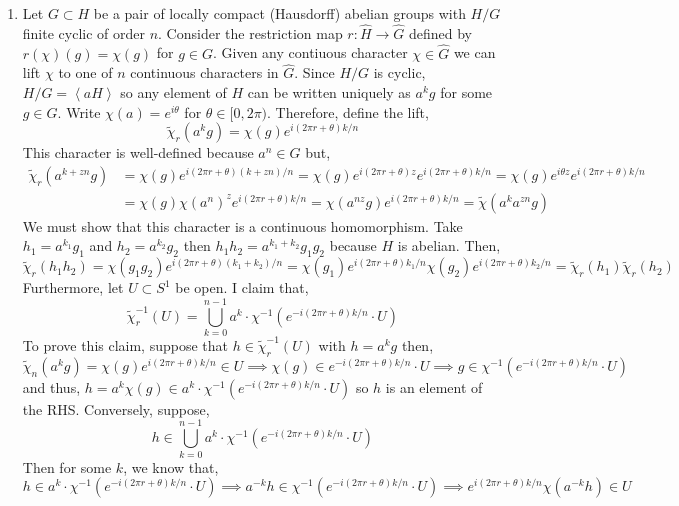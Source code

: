 \documentclass[12pt]{extarticle}
\begin{document}
 
\begin{enumerate}
\item Let $G \subset H$ be a pair of locally compact (Hausdorff) abelian groups with $H/G$ finite cyclic of order $n$. Consider the restriction map $r : \hat{H} \to \hat{G}$ defined by $r(\chi)(g) = \chi(g)$ for $g \in G$. Given any contiuous character $\chi \in \hat{G}$ we can lift $\chi$ to one of $n$ continuous characters in $\hat{G}$. Since $H/G$ is cyclic, $H/G = \left< a H \right>$ so any element of $H$ can be written uniquely as $a^k g$ for some $g \in G$. Write $\chi(a) = e^{i \theta}$ for $\theta \in [0, 2\pi)$. Therefore, define the lift,
\[\tilde{\chi}_r (a^k g) = \chi(g) e^{ i (2 \pi r + \theta) k /n } \]
This character is well-defined because $a^n \in G$ but,
\begin{align*}
\tilde{\chi}_r (a^{k + zn} g) & = \chi(g) e^{ i (2 \pi r + \theta) (k + zn) / n } = \chi(g) e^{i (2 \pi r + \theta) z} e^{ i (2 \pi r + \theta) k /  n } = \chi(g) e^{i \theta z} e^{ i (2 \pi r + \theta) k /n }
\\
& = \chi(g) \chi(a^n)^z e^{ i (2 \pi r + \theta) k /n } = \chi(a^{nz} g) e^{ i (2 \pi r + \theta) k /n } = \tilde{\chi}(a^k a^{zn} g)
\end{align*}
We must show that this character is a continuous homomorphism. Take $h_1 = a^{k_1} g_1$ and $h_2 = a^{k_2} g_2$ then $h_1 h_2 = a^{k_1 + k_2} g_1 g_2$ because $H$ is abelian. Then,
\[\tilde{\chi}_r(h_1 h_2) = \chi(g_1 g_2) e^{i (2 \pi r + \theta) (k_1 + k_2) /n} = \chi(g_1) e^{i (2 \pi r + \theta) k_1 /n} \chi(g_2) e^{i (2 \pi r + \theta) k_2 /n} = \tilde{\chi}_r(h_1) \tilde{\chi}_r(h_2)  \]
Furthermore, let $U \subset S^1$ be open. I claim that,
\[ \tilde{\chi}_r^{-1}(U) = \bigcup_{k = 0}^{n - 1} a^k \cdot \chi^{-1}(e^{- i (2 \pi r + \theta) k /n} \cdot U )  \] 
To prove this claim, suppose that $h \in \tilde{\chi}_r^{-1}(U)$ with $h = a^k g$ then,
\[\tilde{\chi}_n(a^k g) = \chi(g) e^{i (2 \pi r + \theta) k /n} \in U \implies \chi(g) \in e^{- i (2 \pi r + \theta) k /n} \cdot U  \implies g \in \chi^{-1}(e^{- i (2 \pi r + \theta) k /n} \cdot U) \]
and thus, $h = a^k \chi(g) \in a^k \cdot \chi^{-1}(e^{- i (2 \pi r + \theta) k /n} \cdot U )$ so $h$ is an element of the RHS. Conversely, suppose,
\[ h \in \bigcup_{k = 0}^{n - 1} a^k \cdot \chi^{-1}(e^{- i (2 \pi r + \theta) k /n} \cdot U )  \]  
Then for some $k$, we know that,
\[h \in a^k \cdot \chi^{-1}(e^{- i (2 \pi r + \theta) k /n} \cdot U ) \implies a^{-k} h \in \chi^{-1}(e^{- i (2 \pi r + \theta) k /n} \cdot U ) \implies  e^{i (2 \pi r + \theta) k /n} \chi(a^{-k} h) \in U\]

\end{enumerate}
\end{document}

